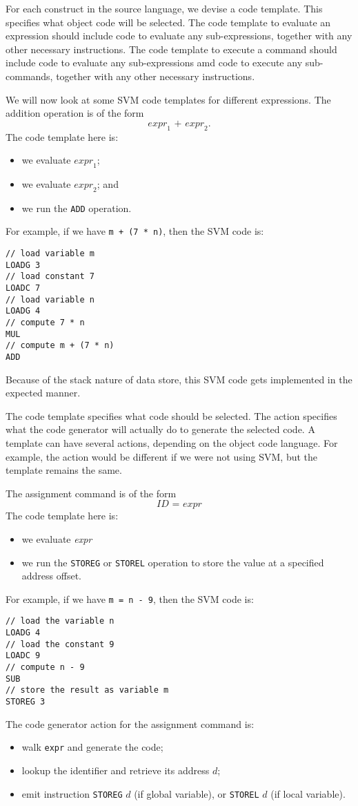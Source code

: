 \documentclass[a4paper, openany]{memoir}
\begin{document}
For each construct in the source language, we devise a code template. This specifies what object code will be selected. The code template to evaluate an expression should include code to evaluate any sub-expressions, together with any other necessary instructions. The code template to execute a command should include code to evaluate any sub-expressions amd code to execute any sub-commands, together with any other necessary instructions.

We will now look at some SVM code templates for different expressions. The addition operation is of the form
\[\textit{expr}_1 \texttt{ + } \textit{expr}_2.\]
The code template here is: 
\begin{itemize}
    \item we evaluate $\textit{expr}_1$; 
    \item we evaluate $\textit{expr}_2$; and 
    \item we run the \texttt{ADD} operation.
\end{itemize}
For example, if we have \texttt{m + (7 * n)}, then the SVM code is:
\begin{lstlisting}[language=SVM]
// load variable m
LOADG 3
// load constant 7
LOADC 7
// load variable n
LOADG 4
// compute 7 * n
MUL
// compute m + (7 * n)
ADD
\end{lstlisting}
Because of the stack nature of data store, this SVM code gets implemented in the expected manner.

The code template specifies what code should be selected. The action specifies what the code generator will actually do to generate the selected code. A template can have several actions, depending on the object code language. For example, the action would be different if we were not using SVM, but the template remains the same.

The assignment command is of the form
\[\textit{ID} \texttt{ = } \textit{expr}\]
The code template here is:
\begin{itemize}
    \item we evaluate \textit{expr}
    \item we run the \texttt{STOREG} or \texttt{STOREL} operation to store the value at a specified address offset.
\end{itemize}
For example, if we have \texttt{m = n - 9}, then the SVM code is:
\begin{lstlisting}[language=SVM]
// load the variable n
LOADG 4
// load the constant 9
LOADC 9
// compute n - 9
SUB
// store the result as variable m
STOREG 3
\end{lstlisting}
The code generator action for the assignment command is:
\begin{itemize}
    \item walk \texttt{expr} and generate the code;
    \item lookup the identifier and retrieve its address $d$;
    \item emit instruction \texttt{STOREG} $d$ (if global variable), or \texttt{STOREL} $d$ (if local variable).
\end{itemize}
\end{document}
